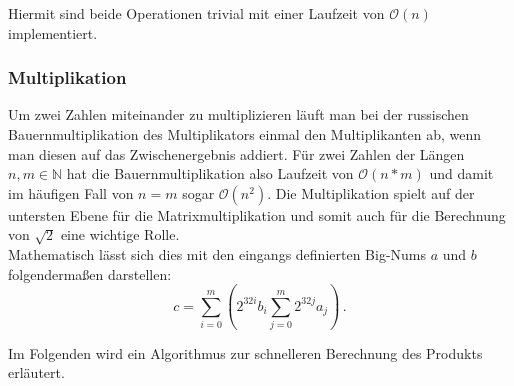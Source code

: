 \documentclass[course=erap]{aspdoc}
\begin{document}
Hiermit sind beide Operationen trivial mit einer Laufzeit von $\mathcal{O}(n)$ implementiert.

\subsubsection*{Multiplikation}
Um zwei Zahlen miteinander zu multiplizieren läuft man bei der russischen Bauernmultiplikation des Multiplikators einmal den Multiplikanten ab, wenn man diesen auf das Zwischenergebnis addiert. 
Für zwei Zahlen der Längen $n, m \in\mathbb{N}$ hat die Bauernmultiplikation also Laufzeit von $\mathcal{O}(n*m)$ und damit im häufigen Fall von $n=m$ sogar $\mathcal{O}(n^2)$.
Die Multiplikation spielt auf der untersten Ebene für die Matrixmultiplikation und somit auch für die Berechnung von $\sqrt{2}$ eine wichtige Rolle.\\
Mathematisch lässt sich dies mit den eingangs definierten Big-Nums $a$ und $b$ folgendermaßen darstellen:
\begin{equation}
  c = \sum_{i=0}^m \left(2^{32i} b_i \sum_{j=0}^m 2^{32j}a_j\right) \, .
\end{equation}

Im Folgenden wird ein Algorithmus zur schnelleren Berechnung des Produkts erläutert.
\end{document}
